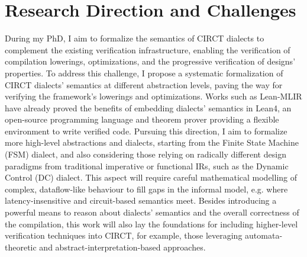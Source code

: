 \documentclass[acmtog]{acmart}
\begin{document}
\section{Research Direction and Challenges}

During my PhD, I aim to formalize the semantics of CIRCT dialects to complement the existing verification infrastructure, enabling the verification 
of compilation lowerings, optimizations, and the progressive verification of designs' properties. 
To address this challenge, I propose a systematic formalization of CIRCT dialects' semantics at different abstraction levels, 
paving the way for verifying the framework's lowerings and optimizations. 
Works such as Lean-MLIR\cite{bhat2024verifying} have already proved the benefits 
of embedding dialects' semantics in Lean4, an open-source programming language and theorem prover providing a flexible environment to write verified code. 
Pursuing this direction, I aim to formalize more high-level abstractions and dialects, starting from the Finite State Machine (FSM) dialect, 
and also considering those relying on radically different design paradigms from traditional imperative or functional IRs, such as the Dynamic Control (DC) dialect. 
This aspect will require careful mathematical modelling of complex, dataflow-like behaviour to fill gaps in the informal model, e.g. where latency-insensitive and 
circuit-based semantics meet. Besides introducing a powerful means to reason about dialects' semantics and the overall correctness of the compilation, 
this work will also lay the foundations for including higher-level verification techniques into CIRCT, for example, those leveraging automata-theoretic 
and abstract-interpretation-based approaches. 
\end{document}
